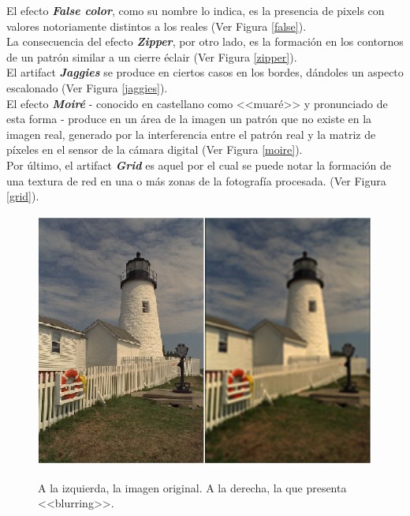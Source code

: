 \documentclass[a4paper]{article}
\begin{document}
El efecto \textit{\textbf{False color}}, como su nombre lo indica, es la presencia de pixels con valores notoriamente distintos a los reales (Ver Figura \ref{false}). \\

La consecuencia del efecto \textit{\textbf{Zipper}}, por otro lado, es la formación en los contornos de un patrón similar a un cierre éclair (Ver Figura \ref{zipper}).\\

El artifact \textit{\textbf{Jaggies}} se produce en ciertos casos en los bordes, dándoles un aspecto escalonado (Ver Figura \ref{jaggies}).\\

El efecto \textit{\textbf{Moiré}} - conocido en castellano como <<muaré>> y pronunciado de esta forma - produce en un área de la imagen un patrón que no existe en la imagen real, generado por la interferencia entre el patrón real y la matriz de píxeles en el sensor de la cámara digital (Ver Figura \ref{moire}).\\

Por último, el artifact\textit{ \textbf{Grid}} es aquel por el cual se puede notar la formación de una textura de red en una o más zonas de la fotografía procesada. (Ver Figura \ref{grid}). 

\begin{figure}[h!]
	\caption{A la izquierda, la imagen original. A la derecha, la que presenta <<blurring>>.}
	\begin{center}
	\includegraphics[scale=0.66]{imagenes/blurring}
	\label{blurring}
  \end{center}
\end{figure}
\end{document}
